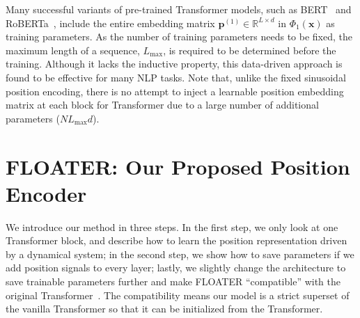 \documentclass[11pt]{article}
\def\vp{{\bm{p}}}
\def\vx{{\bm{x}}}
\def\sR{{\mathbb{R}}}
\begin{document}
Many successful variants of pre-trained Transformer models, such as BERT~\cite{devlin2018bert} and RoBERTa~\cite{liu2019roberta}, include the entire embedding matrix $\vp^{(1)}\in \sR^{L\times d}$ in $\Phi_1(\vx)$ as training parameters. As the number of training parameters needs to be fixed, the maximum length of a sequence, $L_{\text{max}}$, is required to be determined before the training. Although it lacks the inductive property, this data-driven approach is found to be effective for many NLP tasks. Note that, unlike the fixed sinusoidal position encoding, there is no attempt to inject a learnable position embedding matrix at each block for Transformer due to a large number of additional parameters ($NL_{\text{max}}d$). 

\section{FLOATER: Our Proposed Position Encoder}
\label{sec:flower}
We introduce our method in three steps. In the first step, we only look at one Transformer block, and describe how to learn the position representation driven by a dynamical system; in the second step, we show how to save parameters if we add position signals to every layer; lastly, we slightly change the architecture to save trainable parameters further and make FLOATER ``compatible'' with the original Transformer~\cite{vaswani2017attention}. The compatibility means our model is a strict superset of the vanilla Transformer so that it can be initialized from the Transformer. 
\end{document}

